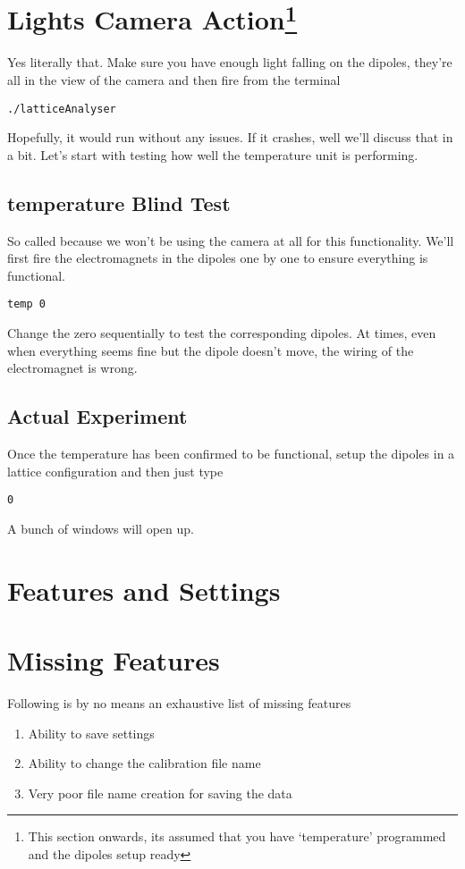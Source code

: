 \section{Lights Camera Action\protect\footnote{This section onwards, its assumed that you have `temperature' programmed and the dipoles setup ready}}
	Yes literally that. Make sure you have enough light falling on the dipoles, they're all in the view of the camera and then fire from the terminal
	\begin{lstlisting}
./latticeAnalyser
	\end{lstlisting}
	Hopefully, it would run without any issues. If it crashes, well we'll discuss that in a bit. Let's start with testing how well the temperature unit is performing.
	\subsection{temperature Blind Test}
		So called because we won't be using the camera at all for this functionality. We'll first fire the electromagnets in the dipoles one by one to ensure everything is functional.
		\begin{lstlisting}
temp 0
		\end{lstlisting}
		Change the zero sequentially to test the corresponding dipoles. At times, even when everything seems fine but the dipole doesn't move, the wiring of the electromagnet is wrong.
	\subsection{Actual Experiment}
		Once the temperature has been confirmed to be functional, setup the dipoles in a lattice configuration and then just type
		\begin{lstlisting}
0
		\end{lstlisting}
		A bunch of windows will open up. 
\section{Features and Settings}

\section{Missing Features}
	Following is by no means an exhaustive list of missing features
	\begin{enumerate}
		\item Ability to save settings
		\item Ability to change the calibration file name
		\item Very poor file name creation for saving the data
	\end{enumerate}